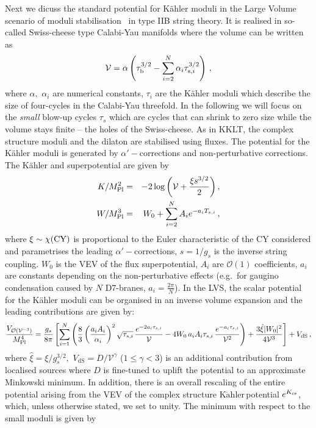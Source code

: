 \documentclass[12pt]{article}
\newcommand{\V}{\mathcal{V}}
\newcommand{\Kahler}{\ensuremath{\text{K}\ddot{\text{a}}\text{hler}\,}}
\begin{document}
Next we dicuss the standard potential for K\"ahler moduli in the Large Volume scenario of moduli stabilisation~\cite{Balasubramanian:2005zx,Conlon:2005ki} in type IIB string theory. It is realised in so-called Swiss-cheese type Calabi-Yau manifolds where the volume can be written as
\begin{equation}
\V = \alpha \left(\tau_{\rm b}^{3/2} - \sum_{i=2}^N \alpha_{i} \tau_{{\rm s}, i}^{3/2}\right)\,,
\end{equation}
where $\alpha,$ $\alpha_i$ are numerical constants, $\tau_i$ are the K\"ahler moduli which describe the size of four-cycles in the Calabi-Yau threefold. In the following we will focus on the \textit{small} blow-up cycles $\tau_s$ which are cycles that can shrink to zero size while the volume stays finite -- the holes of the Swiss-cheese. As in KKLT, the complex structure moduli and the dilaton are stabilised using fluxes. The potential for the K\"ahler moduli is generated by $\alpha'-$corrections and non-perturbative corrections. The K\"ahler and superpotential are given by
\begin{eqnarray}
K/M^2_{\rm Pl} &=& - 2 \log\left(\V + \frac{\xi s^{3/2}}{2}\right),\\
W/M^3_{\rm Pl} &=& W_0 + \sum_{i=2}^N A_i e^{-a_i T_{s,i}}\,,
\end{eqnarray}
where $\xi \sim\chi({\rm CY})$ is proportional to the Euler characteristic of the CY considered and parametrises the leading $\alpha'-$corrections, $s=1/g_s$ is the inverse string coupling. $W_0$ is the VEV of the flux superpotential, $A_i$ are $\mathcal{O}(1)$ coefficients, $a_i$ are constants depending on the non-perturbative effects (e.g.~for gaugino condensation caused by $N$ D7-branes,  $a_i = \frac{2 \pi}{N}$).
In the LVS, the scalar potential for the K\"ahler moduli can be organised in an inverse volume expansion and the leading contributions are given by:
\begin{equation}
\label{eq:LVSscalarpotential}
\frac{V_{\mathcal{O}\left(\V^{-3}\right)}}{M^4_{\rm Pl}} = \frac{g_s}{8 \pi} \left[\sum_{i=1}^N \left(\frac{8}{3} \left(\frac{a_i A_i}{\alpha_i}\right)^2 \sqrt{\tau_{s, i}} \,\frac{e^{-2 a_i \tau_{s, i}}}{\V} -  4 W_0  \,a_i A_i \tau_{s, i} \,\frac{e^{-a_i \tau_{s, i}}}{\V^2} \right) + \frac{3 \hat{\xi} |W_0|^2}{4 \V^3}\right] + V_{\text{dS}} \,,
\end{equation}
where $\hat{\xi}=\xi/g_s^{3/2},$ $V_{\text{dS}}=D/\V^\gamma$ ($1\leq\gamma< 3$) is an additional contribution from localised sources where $D$ is fine-tuned to uplift the potential to an approximate Minkowski minimum. In addition, there is an overall rescaling of the entire potential arising from the VEV of the complex structure \Kahler potential $e^{K_{\rm cs}}$, which, unless otherwise stated, we set to unity. The minimum with respect to the small moduli is given by
\end{document}
